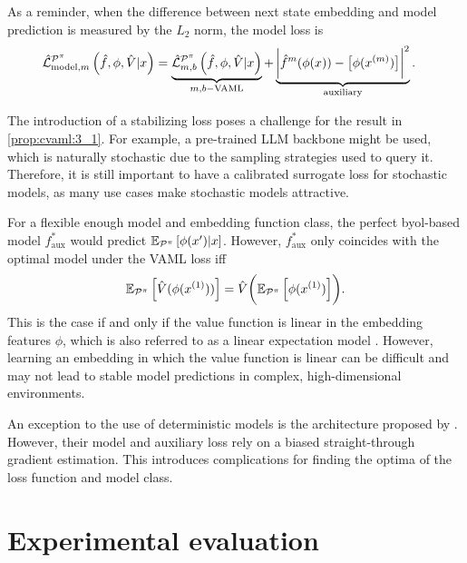 As a reminder, when the difference between next state embedding and model prediction is measured by the $L_2$ norm, the model loss is
\begin{align}
    & \hat{\mathcal{L}}^{\P^\pi}_{\mathrm{model}, m}\left(\hat{f},
\phi, \hat{V}|x\right) = \underbrace{\hat{\mathcal{L}}^{\P^\pi}_{m,b}\left(\hat{f},\phi, \hat{V}|x\right)}_{m,b\mathrm{-VAML}} + \underbrace{\biggl| \hat{f}^m(\phi(x)) - \bigl[\phi(x^{(m)}) \bigr] \biggr|^2}_\mathrm{auxiliary}.
\end{align}

The introduction of a stabilizing loss poses a challenge for the result in \autoref{prop:cvaml:3_1}.
For example, a pre-trained LLM backbone might be used, which is naturally stochastic due to the sampling strategies used to query it.
Therefore, it is still important to have a calibrated surrogate loss for stochastic models, as many use cases make stochastic models attractive.

For a flexible enough model and embedding function class, the perfect \ac{byol}-based model $f^*_\mathrm{aux}$ would predict $\EEX{\P^\pi}{\phi(x')| x}$.
However, $f^*_\mathrm{aux}$ only coincides with the optimal model under the VAML loss iff
\begin{align}
    \EEX{\P^\pi}{\hat{V}(\phi(x^{(1)}))} = \hat{V}\biggl(\EEX{\P^\pi}{\phi(x^{(1)})}\biggr).
\end{align}
This is the case if and only if the value function is linear in the embedding features $\phi$, which is also referred to as a linear expectation model \parencite{wan2019planning}.
However,  learning an embedding in which the value function is linear can be difficult and may not lead to stable model predictions in complex, high-dimensional environments.

An exception to the use of deterministic models is the architecture proposed by \textcite{antonoglou2022planning}.
However, their model and auxiliary loss rely on a biased straight-through gradient estimation.
This introduces complications for finding the optima of the loss function and model class.

\section{Experimental evaluation}
\label{sec:cvaml:latent_experiments}



